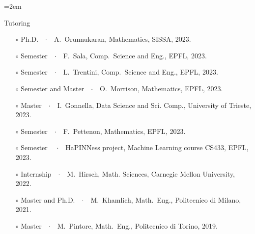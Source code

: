 \documentclass{scrartcl}
\newcommand{\Description}[1]{\hangindent=2em\hangafter=0\noindent\raggedright\footnotesize{#1}\par\normalsize\vspace{1em}} %
\begin{document}
\begin{cv}{}
\Description{{\color{cyan} Tutoring}
\begin{itemize}
    \item[$\circ$] {\color{BrickRed}Ph.D.}\ \ $\cdotp$\ \  A.\ Orunnukaran, Mathematics, SISSA, 2023.
    \item[$\circ$] {\color{NavyBlue}Semester}\ \ $\cdotp$\ \  F.\ Sala, Comp.\ Science and Eng., EPFL, 2023.
    \item[$\circ$] {\color{NavyBlue}Semester}\ \ $\cdotp$\ \  L.\ Trentini, Comp.\ Science and Eng., EPFL, 2023.
    \item[$\circ$] {\color{NavyBlue}Semester} and {\color{PineGreen}Master}\ \ $\cdotp$\ \  O.\ Morrison, Mathematics, EPFL, 2023.
    \item[$\circ$] {\color{PineGreen}Master}\ \ $\cdotp$\ \  I.\ Gonnella, Data Science and Sci. Comp., University of Trieste, 2023.
    \item[$\circ$] {\color{NavyBlue}Semester}\ \ $\cdotp$\ \  F.\ Pettenon, Mathematics, EPFL, 2023.
    \item[$\circ$] {\color{NavyBlue}Semester} \ \ $\cdotp$\ \ HaPINNess project, Machine Learning course CS433, EPFL, 2023.
    \item[$\circ$] {\color{NavyBlue}Internship}\ \ $\cdotp$\ \ M.\ Hirsch, Math. Sciences, Carnegie Mellon University, 2022.
    \item[$\circ$] {\color{PineGreen}Master} and {\color{BrickRed}Ph.D.}\ \ $\cdotp$\ \  M.\ Khamlich, Math.\ Eng., Politecnico di Milano, 2021.
    \item[$\circ$] {\color{PineGreen}Master}\ \ $\cdotp$\ \  M.\ Pintore, Math.\ Eng., Politecnico di Torino, 2019.
\end{itemize}}

\end{cv}
\end{document}
